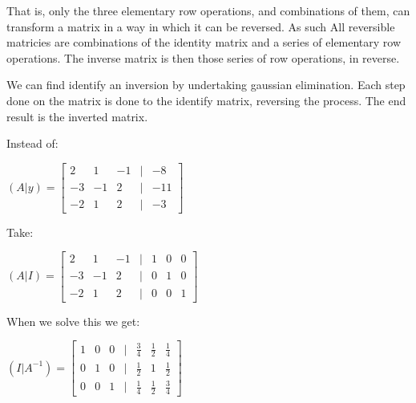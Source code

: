 That is, only the three elementary row operations, and combinations of them, can transform a matrix in a way in which it can be reversed. As such All reversible matricies are combinations of the identity matrix and a series of elementary row operations. The inverse matrix is then those series of row operations, in reverse.

We can find identify an inversion by undertaking gaussian elimination. Each step done on the matrix is done to the identify matrix, reversing the process. The end result is the inverted matrix.

Instead of:

$(A|y)=\begin{bmatrix}2 & 1&-1&|&-8\\-3 & -1&2&|&-11\\-2&1&2&|&-3\end{bmatrix}$

Take:

$(A|I)=\begin{bmatrix}2 & 1&-1&|&1&0&0\\-3 & -1&2&|&0&1&0\\-2&1&2&|&0&0&1\end{bmatrix}$

When we solve this we get:

$(I|A^{-1})=\begin{bmatrix}1 & 0&0&|&\frac{3}{4}&\frac{1}{2}&\frac{1}{4}\\0& 1&0&|&\frac{1}{2}&1&\frac{1}{2}\\0&0&1&|&\frac{1}{4}&\frac{1}{2}&\frac{3}{4}\end{bmatrix}$

